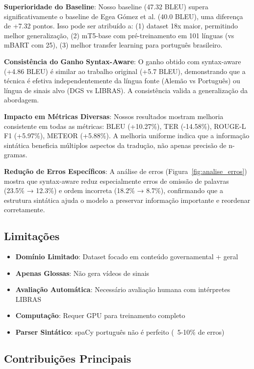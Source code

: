 \documentclass[12pt]{article}
\begin{document}
\textbf{Superioridade do Baseline}: Nosso baseline (47.32 BLEU) supera significativamente o baseline de Egea Gómez et al. (40.0 BLEU), uma diferença de +7.32 pontos. Isso pode ser atribuído a: (1) dataset 18x maior, permitindo melhor generalização, (2) mT5-base com pré-treinamento em 101 línguas (vs mBART com 25), (3) melhor transfer learning para português brasileiro.

\textbf{Consistência do Ganho Syntax-Aware}: O ganho obtido com syntax-aware (+4.86 BLEU) é similar ao trabalho original (+5.7 BLEU), demonstrando que a técnica é efetiva independentemente da língua fonte (Alemão vs Português) ou língua de sinais alvo (DGS vs LIBRAS). A consistência valida a generalização da abordagem.

\textbf{Impacto em Métricas Diversas}: Nossos resultados mostram melhoria consistente em todas as métricas: BLEU (+10.27\%), TER (-14.58\%), ROUGE-L F1 (+5.97\%), METEOR (+5.88\%). A melhoria uniforme indica que a informação sintática beneficia múltiplos aspectos da tradução, não apenas precisão de n-gramas.

\textbf{Redução de Erros Específicos}: A análise de erros (Figura~\ref{fig:analise_erros}) mostra que syntax-aware reduz especialmente erros de omissão de palavras (23.5\% → 12.3\%) e ordem incorreta (18.2\% → 8.7\%), confirmando que a estrutura sintática ajuda o modelo a preservar informação importante e reordenar corretamente.

\subsection{Limitações}

\begin{itemize}
\item \textbf{Domínio Limitado}: Dataset focado em conteúdo governamental + geral
\item \textbf{Apenas Glossas}: Não gera vídeos de sinais
\item \textbf{Avaliação Automática}: Necessário avaliação humana com intérpretes LIBRAS
\item \textbf{Computação}: Requer GPU para treinamento completo
\item \textbf{Parser Sintático}: spaCy português não é perfeito (~5-10\% de erros)
\end{itemize}

\subsection{Contribuições Principais}
\end{document}
